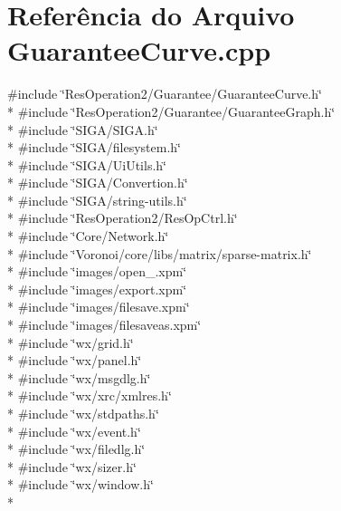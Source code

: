 \section{Referência do Arquivo Guarantee\+Curve.\+cpp}
\label{_guarantee_curve_8cpp}
{\ttfamily \#include \char`\"{}Res\+Operation2/\+Guarantee/\+Guarantee\+Curve.\+h\char`\"{}}\\*
{\ttfamily \#include \char`\"{}Res\+Operation2/\+Guarantee/\+Guarantee\+Graph.\+h\char`\"{}}\\*
{\ttfamily \#include \char`\"{}S\+I\+G\+A/\+S\+I\+G\+A.\+h\char`\"{}}\\*
{\ttfamily \#include \char`\"{}S\+I\+G\+A/filesystem.\+h\char`\"{}}\\*
{\ttfamily \#include \char`\"{}S\+I\+G\+A/\+Ui\+Utils.\+h\char`\"{}}\\*
{\ttfamily \#include \char`\"{}S\+I\+G\+A/\+Convertion.\+h\char`\"{}}\\*
{\ttfamily \#include \char`\"{}S\+I\+G\+A/string-\/utils.\+h\char`\"{}}\\*
{\ttfamily \#include \char`\"{}Res\+Operation2/\+Res\+Op\+Ctrl.\+h\char`\"{}}\\*
{\ttfamily \#include \char`\"{}Core/\+Network.\+h\char`\"{}}\\*
{\ttfamily \#include \char`\"{}Voronoi/core/libs/matrix/sparse-\/matrix.\+h\char`\"{}}\\*
{\ttfamily \#include \char`\"{}images/open\+\_.\+xpm\char`\"{}}\\*
{\ttfamily \#include \char`\"{}images/export.\+xpm\char`\"{}}\\*
{\ttfamily \#include \char`\"{}images/filesave.\+xpm\char`\"{}}\\*
{\ttfamily \#include \char`\"{}images/filesaveas.\+xpm\char`\"{}}\\*
{\ttfamily \#include \char`\"{}wx/grid.\+h\char`\"{}}\\*
{\ttfamily \#include \char`\"{}wx/panel.\+h\char`\"{}}\\*
{\ttfamily \#include \char`\"{}wx/msgdlg.\+h\char`\"{}}\\*
{\ttfamily \#include \char`\"{}wx/xrc/xmlres.\+h\char`\"{}}\\*
{\ttfamily \#include \char`\"{}wx/stdpaths.\+h\char`\"{}}\\*
{\ttfamily \#include \char`\"{}wx/event.\+h\char`\"{}}\\*
{\ttfamily \#include \char`\"{}wx/filedlg.\+h\char`\"{}}\\*
{\ttfamily \#include \char`\"{}wx/sizer.\+h\char`\"{}}\\*
{\ttfamily \#include \char`\"{}wx/window.\+h\char`\"{}}\\*
